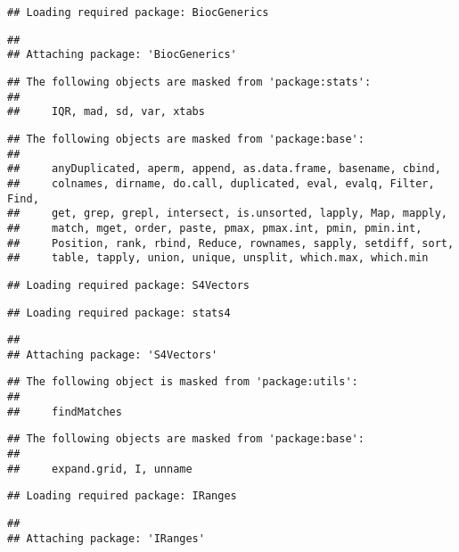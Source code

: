 \documentclass[
]{article}
\begin{document}
\begin{verbatim}
## Loading required package: BiocGenerics
\end{verbatim}

\begin{verbatim}
## 
## Attaching package: 'BiocGenerics'
\end{verbatim}

\begin{verbatim}
## The following objects are masked from 'package:stats':
## 
##     IQR, mad, sd, var, xtabs
\end{verbatim}

\begin{verbatim}
## The following objects are masked from 'package:base':
## 
##     anyDuplicated, aperm, append, as.data.frame, basename, cbind,
##     colnames, dirname, do.call, duplicated, eval, evalq, Filter, Find,
##     get, grep, grepl, intersect, is.unsorted, lapply, Map, mapply,
##     match, mget, order, paste, pmax, pmax.int, pmin, pmin.int,
##     Position, rank, rbind, Reduce, rownames, sapply, setdiff, sort,
##     table, tapply, union, unique, unsplit, which.max, which.min
\end{verbatim}

\begin{verbatim}
## Loading required package: S4Vectors
\end{verbatim}

\begin{verbatim}
## Loading required package: stats4
\end{verbatim}

\begin{verbatim}
## 
## Attaching package: 'S4Vectors'
\end{verbatim}

\begin{verbatim}
## The following object is masked from 'package:utils':
## 
##     findMatches
\end{verbatim}

\begin{verbatim}
## The following objects are masked from 'package:base':
## 
##     expand.grid, I, unname
\end{verbatim}

\begin{verbatim}
## Loading required package: IRanges
\end{verbatim}

\begin{verbatim}
## 
## Attaching package: 'IRanges'
\end{verbatim}
\end{document}
